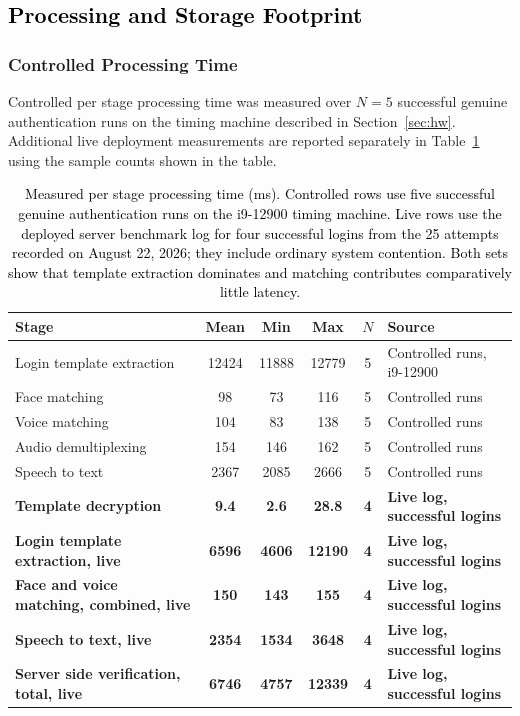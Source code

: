 \documentclass[runningheads]{llncs}
\begin{document}
{\color{black}

\subsection{\textcolor{black}{Processing and Storage Footprint}}\label{sec:perf}
\subsubsection{Controlled Processing Time}
Controlled per stage processing time was measured over $N=5$ successful genuine authentication runs on the timing machine described in Section~\ref{sec:hw}. Additional live deployment measurements are reported separately in Table~\ref{tab:stages} using the sample counts shown in the table.

\begin{table}[!t]
\caption{\textcolor{black}{Measured per stage processing time (ms). Controlled rows use five successful genuine authentication runs on the i9-12900 timing machine. Live rows use the deployed server benchmark log for four successful logins from the 25 attempts recorded on August 22, 2026; they include ordinary system contention. Both sets show that template extraction dominates and matching contributes comparatively little latency.}}
\label{tab:stages}
\centering
\renewcommand{\arraystretch}{1.27}
\setlength{\tabcolsep}{6pt}
\footnotesize
\begin{tabular}{|>{\raggedright\arraybackslash}p{5.4cm}|c|c|c|c|>{\raggedright\arraybackslash}p{4.3cm}|}
\hline
\rule{0pt}{2.8ex}
\textbf{Stage} &
\textbf{Mean} &
\textbf{Min} &
\textbf{Max} &
\textbf{$N$} &
\textbf{Source} \\
\hline
Login template extraction & 12424 & 11888 & 12779 & 5 & Controlled runs, i9-12900 \\
Face matching             & 98    & 73    & 116   & 5 & Controlled runs \\
Voice matching            & 104   & 83    & 138   & 5 & Controlled runs \\
Audio demultiplexing      & 154   & 146   & 162   & 5 & Controlled runs \\
Speech to text            & 2367  & 2085  & 2666  & 5 & Controlled runs \\
\textbf{Template decryption} & \textbf{9.4} & \textbf{2.6} & \textbf{28.8} & \textbf{4} & \textbf{Live log, successful logins} \\
\textbf{Login template extraction, live} & \textbf{6596} & \textbf{4606} & \textbf{12190} & \textbf{4} & \textbf{Live log, successful logins} \\
\textbf{Face and voice matching, combined, live} & \textbf{150} & \textbf{143} & \textbf{155} & \textbf{4} & \textbf{Live log, successful logins} \\
\textbf{Speech to text, live} & \textbf{2354} & \textbf{1534} & \textbf{3648} & \textbf{4} & \textbf{Live log, successful logins} \\
\textbf{Server side verification, total, live} & \textbf{6746} & \textbf{4757} & \textbf{12339} & \textbf{4} & \textbf{Live log, successful logins} \\
\hline
\end{tabular}
\end{table}

}
\end{document}
